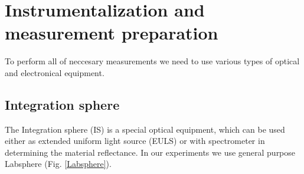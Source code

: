 
\chapter{Instrumentalization and measurement preparation}
To perform all of neccesary measurements we need to use various types of optical and electronical equipment.
\section{Integration sphere}
The Integration sphere (IS) is a special optical equipment, which can be used either as extended uniform light source (EULS) or with spectrometer in determining the material reflectance. In our experiments we use general purpose Labsphere (Fig. \ref{Labsphere}).

